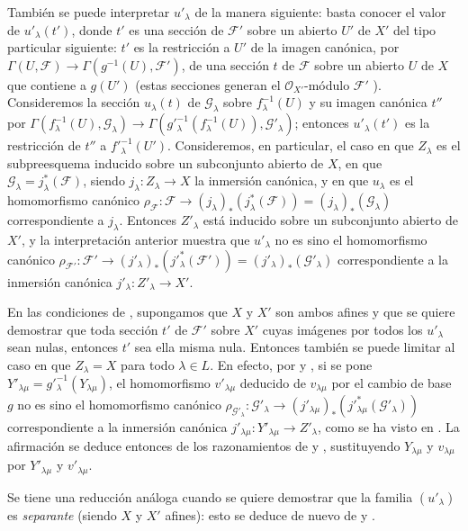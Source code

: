\begin{env}[11.9.5]
También se puede interpretar $u'_\lambda$ de la manera siguiente: basta conocer el valor de $u'_\lambda(t')$, donde $t'$ es una sección de $\mathcal F'$ sobre un abierto $U'$ de $X'$ del tipo particular siguiente: $t'$ es la restricción a $U'$ de la imagen canónica, por $\Gamma(U,\mathcal F)\to\Gamma(g^{-1}(U),\mathcal F')$, de una sección $t$ de $\mathcal F$ sobre un abierto $U$ de $X$ que contiene a $g(U')$ (estas secciones generan el $\mathcal O_{X'}$-módulo $\mathcal F'$ ).
Consideremos la sección $u_\lambda(t)$ de $\mathcal G_\lambda$ sobre $f_\lambda^{-1}(U)$ y su imagen canónica $t''$ por $\Gamma(f_\lambda^{-1}(U),\mathcal G_\lambda)\to
\Gamma(g'^{-1}_\lambda(f_\lambda^{-1}(U)),\mathcal G'_\lambda)$; entonces $u'_\lambda(t')$ es la restricción de $t''$ a $f'^{-1}_\lambda(U')$.
Consideremos, en particular, el caso en que $Z_\lambda$ es el subpreesquema inducido sobre un subconjunto abierto de $X$, en que $\mathcal G_\lambda=j_\lambda^*(\mathcal F)$, siendo $j_\lambda:Z_\lambda\to X$ la inmersión canónica, y en que $u_\lambda$ es el homomorfismo canónico $\rho_{\mathcal F}:\mathcal F\to(j_\lambda)_*(j_\lambda^*(\mathcal F))
=(j_\lambda)_*(\mathcal G_\lambda)$  correspondiente a $j_\lambda$.
Entonces $Z'_\lambda$ está inducido sobre un subconjunto abierto de $X'$, y la interpretación anterior muestra que $u'_\lambda$ no es sino el homomorfismo canónico $\rho_{\mathcal F'}:\mathcal F'\to
(j'_\lambda)_*(j'^*_\lambda(\mathcal F'))
=(j'_\lambda)_*(\mathcal G'_\lambda)$ correspondiente a la inmersión canónica $j'_\lambda:Z'_\lambda\to X'$.
\end{env}

\begin{env}[11.9.6]
\label{IV.11.9.6}
En las condiciones de , supongamos que $X$ y $X'$ son ambos afines y que se quiere demostrar que toda sección $t'$ de $\mathcal F'$ sobre $X'$ cuyas imágenes por todos los $u'_\lambda$ sean nulas, entonces $t'$ sea ella misma nula.
Entonces también se puede limitar al caso en que $Z_\lambda=X$ para todo $\lambda\in L$.
En efecto, por  y , si se pone $Y'_{\lambda\mu}=g'^{-1}_\lambda(Y_{\lambda\mu})$, el homomorfismo $v'_{\lambda\mu}$ deducido de $v_{\lambda\mu}$ por el cambio de base $g$ no es sino el homomorfismo canónico
$\rho_{\mathcal G'_\lambda}:\mathcal G'_\lambda\to
(j'_{\lambda\mu})_*(j'^*_{\lambda\mu}(\mathcal G'_\lambda))$ correspondiente a la inmersión canónica $j'_{\lambda\mu}:Y'_{\lambda\mu}\to Z'_\lambda$, como se ha visto en .
La afirmación se deduce entonces de los razonamientos de  y , sustituyendo $Y_{\lambda\mu}$ y $v_{\lambda\mu}$ por $Y'_{\lambda\mu}$ y $v'_{\lambda\mu}$.

Se tiene una reducción análoga cuando se quiere demostrar que la familia $(u'_\lambda)$ es \emph{separante} (siendo $X$ y $X'$ afines): esto se deduce de nuevo de  y .
\end{env}

